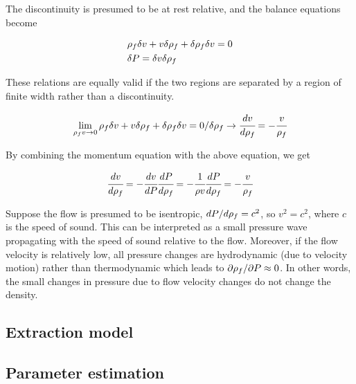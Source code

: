 \documentclass[a4paper,fleqn]{cas-dc}
\begin{document}
The discontinuity is presumed to be at rest relative, and the balance equations become		

{\footnotesize
	\begin{align*}
		&{\color{black}\rho_f} \delta v + v \delta {\color{black}\rho_f} + \delta {\color{black}\rho_f} \delta v = 0 \\
		&\delta {\color{black}P} = \delta v \delta {\color{black}\rho_f}
	\end{align*}
}

These relations are equally valid if the two regions are separated by a region of finite width rather than a discontinuity. 

{\footnotesize
	\begin{equation*}
		\lim_{{\color{black}\rho_f} v \rightarrow 0} {\color{black}\rho_f} \delta v + v \delta {\color{black}\rho_f} + \delta {\color{black}\rho_f} \delta v = 0 / \delta {\color{black}\rho_f} \rightarrow \cfrac{d v}{d {\color{black}\rho_f}} = - \cfrac{v}{{\color{black}\rho_f}}
	\end{equation*}
}

By combining the momentum equation with the above equation, we get

{\footnotesize
	\begin{equation} \label{EQ: Pressure_Velocity}
		\cfrac{d v}{d {\color{black}\rho_f}} = - \cfrac{d v}{d{\color{black}P}} \cfrac{d {\color{black}P}}{d {\color{black}\rho_f}} = -\cfrac{1}{\rho v} \cfrac{d{\color{black}P}}{d{\color{black}\rho_f}} = -\cfrac{v}{{\color{black}\rho_f}}
	\end{equation}
}

Suppose the flow is presumed to be isentropic, $d{\color{black}P}/d{\color{black}\rho_f} = c^2$, so $v^2=c^2$, where $c$ is the speed of sound. This can be interpreted as a small pressure wave propagating with the speed of sound relative to the flow. Moreover, if the flow velocity is relatively low, all pressure changes are hydrodynamic (due to velocity motion) rather than thermodynamic which leads to $\partial {\color{black}\rho_f} / \partial {\color{black}P} \approx 0$. In other words, the small changes in pressure due to flow velocity changes do not change the density. 

\subsection{Extraction model} \label{CH: Extraction_model}


\subsection{Parameter estimation} \label{CH: Parameter_estimation}

\end{document}
